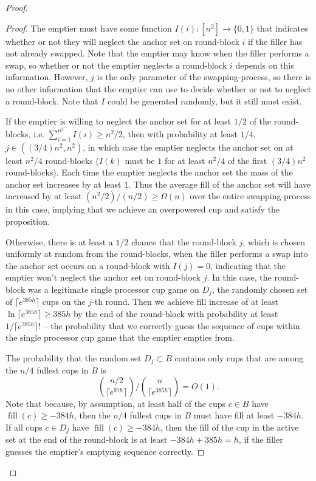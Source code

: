 \documentclass[twocolumn]{article}[10pt]
\DeclareMathOperator{\fil}{\text{fill}}
\begin{document}
\begin{proof}
\begin{proof}
  The emptier must have some function $I(i): [n^2] \to \{0,1\}$ that indicates whether or
  not they will neglect the anchor set on round-block $i$ if the filler has not
  already swapped. Note that the emptier may know when the filler performs a
  swap, so whether or not the emptier neglects a round-block $i$ depends on
  this information. However, $j$ is the only parameter of the swapping-process,
  so there is no other information that the emptier can use to decide whether
  or not to neglect a round-block. Note that $I$ could be generated randomly,
  but it still must exist. 

  If the emptier is willing to neglect the anchor set for at least $1/2$ of the
  round-blocks, i.e. $\sum_{i=1}^{n^2} I(i) \ge n^2 / 2$, then with probability
  at least $1/4$, $j \in ((3/4) n^2, n^2)$, in which case the emptier neglects
  the anchor set on at least $n^2/4$ round-blocks ($I(k)$ must be $1$ for at
  least $n^2/4$ of the first $(3/4)n^2$ round-blocks). Each time the emptier
  neglects the anchor set the mass of the anchor set increases by at least $1$.
  Thus the average fill of the anchor set will have increased by at least
  $(n^2/2)/(n/2) \ge \Omega(n)$ over the entire swapping-process in this
  case, implying that we achieve an overpowered cup and satisfy the proposition. 

  Otherwise, there is at least a $1/2$ chance that the round-block $j$, which
  is chosen uniformly at random from the round-blocks, when the filler performs
  a swap into the anchor set occurs on a round-block with $I(j)=0$, indicating
  that the emptier won't neglect the anchor set on round-block $j$. In this
  case, the round-block was a legitimate single processor cup game on $D_j$,
  the randomly chosen set of $\lceil e^{385h} \rceil$ cups on the $j$-th round.
  Then we achieve fill increase of at least $\ln \lceil e^{385h} \rceil \ge 385h$
  by the end of the round-block with probability at least $1/\lceil
  e^{385h}\rceil!$ -- the probability that we correctly guess the sequence of
  cups within the single processor cup game that the emptier empties from. 

  The probability that the random set $D_j \subset B$ contains only cups that
  are among the $n/4$ fullest cups in $B$ is $${n/2 \choose {\lceil e^{97h}
  \rceil}} / {n \choose {\lceil e^{385h}\rceil}} = O(1).$$ Note that because, by
  assumption, at least half of the cups $c \in B$ have $\fil(c) \ge -384h$, then
  the $n/4$ fullest cups in $B$ must have fill at least $-384h$. If all cups $
  c\in D_j$ have $\fil(c) \ge -384h$, then the fill of the cup in the active set
  at the end of the round-block is at least $-384h + 385h = h$, if the filler
  guesses the emptier's emptying sequence correctly.


\end{proof}
\end{proof}
\end{document}
